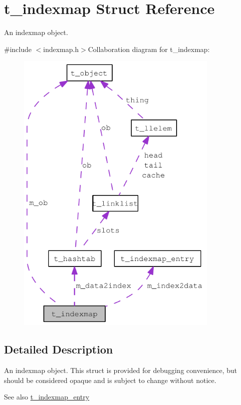 \hypertarget{structt__indexmap}{
\section{t\_\-indexmap Struct Reference}
\label{structt__indexmap}
}


An indexmap object.  


{\ttfamily \#include $<$indexmap.h$>$}Collaboration diagram for t\_\-indexmap:\nopagebreak
\begin{figure}[H]
\begin{center}
\leavevmode
\includegraphics[width=275pt]{structt__indexmap__coll__graph}
\end{center}
\end{figure}


\subsection{Detailed Description}
An indexmap object. This struct is provided for debugging convenience, but should be considered opaque and is subject to change without notice.

\begin{DoxySeeAlso}{See also}
\hyperlink{structt__indexmap__entry}{t\_\-indexmap\_\-entry} 
\end{DoxySeeAlso}
